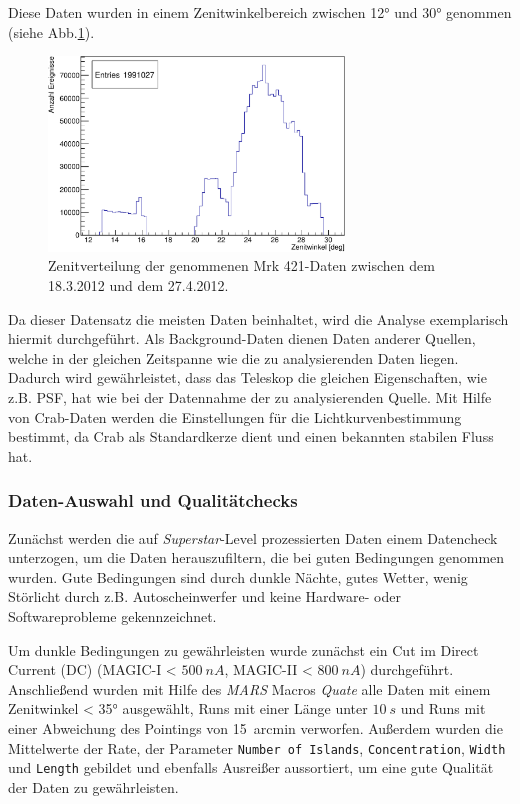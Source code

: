 Diese Daten wurden in einem Zenitwinkelbereich zwischen 12° und 30° genommen (siehe Abb.\ref{Datenset2_fZD}).

\begin{figure}
    \centering
    \includegraphics[width=0.7\textwidth]{./Plots/04_MrkAnalyse/Datenset2/Datenset2_Mrk421_MPointingPos_fZd.pdf}
    \caption{Zenitverteilung der genommenen Mrk 421-Daten zwischen dem 18.3.2012 und dem 27.4.2012.}
    \label{Datenset2_fZD}
\end{figure}


Da dieser Datensatz die meisten Daten beinhaltet, wird die Analyse exemplarisch hiermit durchgeführt.
Als Background-Daten dienen Daten anderer Quellen, welche in der gleichen Zeitspanne wie die zu analysierenden Daten liegen.
Dadurch wird gewährleistet, dass das Teleskop die gleichen Eigenschaften, wie z.B. PSF, hat wie bei der Datennahme der zu analysierenden Quelle. 
Mit Hilfe von Crab-Daten werden die Einstellungen für die Lichtkurvenbestimmung bestimmt, da Crab als Standardkerze dient und einen bekannten stabilen Fluss hat. 


\subsubsection{Daten-Auswahl und Qualitätchecks}
Zunächst werden die auf \textit{Superstar}-Level prozessierten Daten einem Datencheck unterzogen, um die Daten herauszufiltern, die bei guten Bedingungen genommen wurden.
Gute Bedingungen sind durch dunkle Nächte, gutes Wetter, wenig Störlicht durch z.B. Autoscheinwerfer und keine Hardware- oder Softwareprobleme gekennzeichnet.

Um dunkle Bedingungen zu gewährleisten wurde zunächst ein Cut im Direct Current (DC) (MAGIC-I < $\SI{500}{nA}$, MAGIC-II < $\SI{800}{nA}$) durchgeführt.
Anschließend wurden mit Hilfe des \textit{MARS} Macros \textit{Quate} alle Daten mit einem Zenitwinkel < 35° ausgewählt, Runs mit einer Länge unter $\SI{10}{s}$ und Runs mit einer Abweichung des Pointings von \SI{15}{arcmin} verworfen.
Außerdem wurden die Mittelwerte der Rate, der Parameter \texttt{Number of Islands}, \texttt{Concentration}, \texttt{Width} und \texttt{Length} gebildet und ebenfalls Ausreißer aussortiert, um eine gute Qualität der Daten zu gewährleisten.

